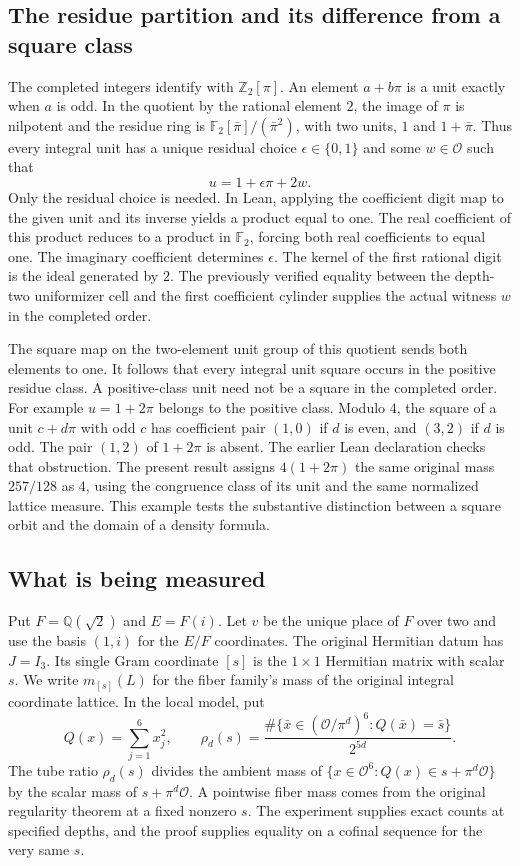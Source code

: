 \documentclass[12pt,letterpaper]{article}
\newcommand{\code}[1]{\texttt{\detokenize{#1}}}
\begin{document}
\subsection{The residue partition and its difference from a square class}
The completed integers identify with $\mathbb Z_2[\pi]$. An element $a+b\pi$ is a unit exactly when $a$ is odd. In the quotient by the rational element $2$, the image of $\pi$ is nilpotent and the residue ring is $\mathbb F_2[\bar\pi]/(\bar\pi^2)$, with two units, $1$ and $1+\bar\pi$. Thus every integral unit has a unique residual choice $\epsilon\in\{0,1\}$ and some $w\in\mathcal O$ such that
\[
u=1+\epsilon\pi+2w.
\]
Only the residual choice is needed. In Lean, applying the coefficient digit map to the given unit and its inverse yields a product equal to one. The real coefficient of this product reduces to a product in $\mathbb F_2$, forcing both real coefficients to equal one. The imaginary coefficient determines $\epsilon$. The kernel of the first rational digit is the ideal generated by $2$. The previously verified equality between the depth-two uniformizer cell and the first coefficient cylinder supplies the actual witness $w$ in the completed order.

The square map on the two-element unit group of this quotient sends both elements to one. It follows that every integral unit square occurs in the positive residue class. A positive-class unit need not be a square in the completed order. For example $u=1+2\pi$ belongs to the positive class. Modulo $4$, the square of a unit $c+d\pi$ with odd $c$ has coefficient pair $(1,0)$ if $d$ is even, and $(3,2)$ if $d$ is odd. The pair $(1,2)$ of $1+2\pi$ is absent. The earlier Lean declaration \code{RamDilate.Near.twist_nonsquare} checks that obstruction. The present result assigns $4(1+2\pi)$ the same original mass $257/128$ as $4$, using the congruence class of its unit and the same normalized lattice measure. This example tests the substantive distinction between a square orbit and the domain of a density formula.


\subsection{What is being measured}
Put $F=\mathbb Q(\sqrt2)$ and $E=F(i)$. Let $v$ be the unique place of $F$ over two and use the basis $(1,i)$ for the $E/F$ coordinates. The original Hermitian datum has $J=I_3$. Its single Gram coordinate $[s]$ is the $1\times1$ Hermitian matrix with scalar $s$. We write $m_{[s]}(L)$ for the fiber family's mass of the original integral coordinate lattice. In the local model, put
\[
 Q(x)=\sum_{j=1}^6 x_j^2,\qquad
 \rho_d(s)=\frac{\#\{\bar x\in(\mathcal O/\pi^d)^6: Q(\bar x)=\bar s\}}{2^{5d}}.
\]
The tube ratio $\rho_d(s)$ divides the ambient mass of $\{x\in\mathcal O^6:Q(x)\in s+\pi^d\mathcal O\}$ by the scalar mass of $s+\pi^d\mathcal O$. A pointwise fiber mass comes from the original regularity theorem at a fixed nonzero $s$. The experiment supplies exact counts at specified depths, and the proof supplies equality on a cofinal sequence for the very same $s$.
\end{document}
